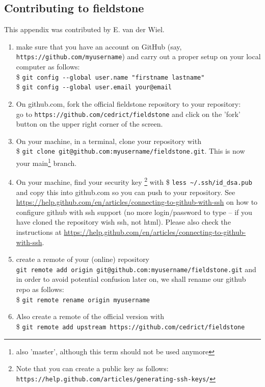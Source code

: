 \newpage
\subsection{Contributing to fieldstone}

\begin{mdframed}[backgroundcolor=red!5]
This appendix was contributed by E. van der Wiel.
\end{mdframed}


\begin{enumerate}
\item make sure that you  have an account on GitHub (say, \verb"https://github.com/myusername") 
and carry out a proper setup on your local computer as follows:\\
\$ \verb'git config --global user.name "firstname lastname" '\\
\$ \verb'git config --global user.email your@email'

\item On github.com, fork the official fieldstone 
repository to your repository:\\
go to \verb"https://github.com/cedrict/fieldstone" 
and click on the 'fork' button on the upper right corner of the screen.
\item On your machine, in a terminal, clone your repository with \\
\$ \verb"git clone git@github.com:myusername/fieldstone.git". This is now your main\footnote{also 'master', although this term should not be used anymore} branch.

\item On your machine, find your security key \footnote{
Note that you can create a public key as follows: 
{\tt https://help.github.com/articles/generating-ssh-keys/}}
 with \$ \verb"less ~/.ssh/id_dsa.pub" and copy this into github.com 
so you can push to your repository. See \url{https://help.github.com/en/articles/connecting-to-github-with-ssh} on how to configure github with ssh support (no more login/password to type -- if you have cloned the repository wish ssh, not html).
Please also check the instructions at \url{https://help.github.com/en/articles/connecting-to-github-with-ssh}.  
 
\item create a remote of your (online) repository\\
\verb"git remote add origin git@github.com:myusername/fieldstone.git"
and in order to avoid potential confusion later on, we shall rename our github repo as follows:\\
\$ \verb"git remote rename origin myusername" 

\item Also create a remote of the official version with\\
\$ \verb"git remote add upstream https://github.com/cedrict/fieldstone"

\end{enumerate}



